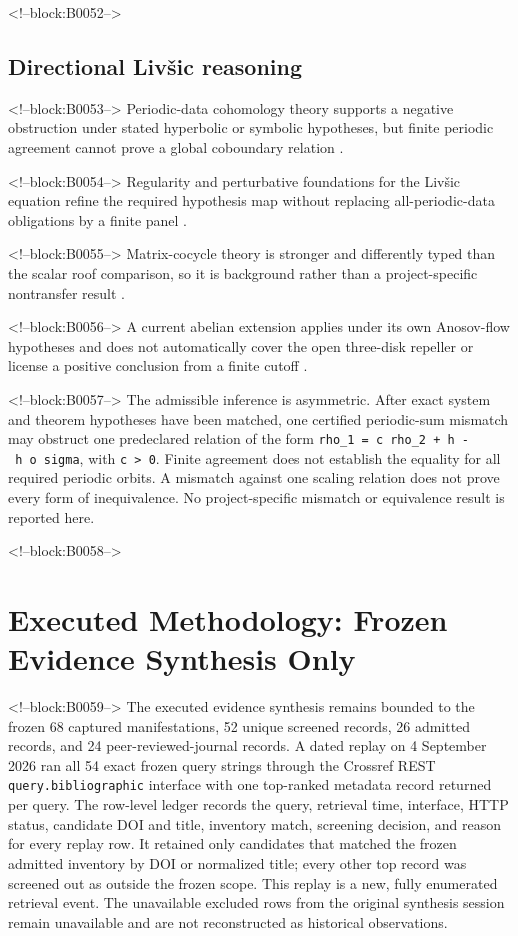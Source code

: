 \documentclass[11pt,a4paper]{article}
\begin{document}
<!--block:B0052-->
\subsection{Directional Livšic reasoning}

<!--block:B0053-->
Periodic-data cohomology theory supports a negative obstruction under stated hyperbolic or symbolic hypotheses, but finite periodic agreement cannot prove a global coboundary relation
\citep{P30-S23}.

<!--block:B0054-->
Regularity and perturbative foundations for the Livšic equation refine the required hypothesis map without replacing all-periodic-data obligations by a finite panel
\citep{P30-S24}.

<!--block:B0055-->
Matrix-cocycle theory is stronger and differently typed than the scalar roof comparison, so it is background rather than a project-specific nontransfer result
\citep{P30-S25}.

<!--block:B0056-->
A current abelian extension applies under its own Anosov-flow hypotheses and does not automatically cover the open three-disk repeller or license a positive conclusion from a finite cutoff
\citep{P30-S26}.

<!--block:B0057-->
The admissible inference is asymmetric. After exact system and theorem hypotheses have been matched, one certified periodic-sum mismatch may obstruct one predeclared relation of the form \texttt{rho\_1\ =\ c\ rho\_2\ +\ h\ -\ h\ o\ sigma}, with \texttt{c\ \textgreater{}\ 0}. Finite agreement does not establish the equality for all required periodic orbits. A mismatch against one scaling relation does not prove every form of inequivalence. No project-specific mismatch or equivalence result is reported here.

<!--block:B0058-->
\section{Executed Methodology: Frozen Evidence Synthesis Only}

<!--block:B0059-->
The executed evidence synthesis remains bounded to the frozen 68 captured
manifestations, 52 unique screened records, 26 admitted records, and 24
peer-reviewed-journal records.  A dated replay on 4 September 2026 ran all
54 exact frozen query strings through the Crossref REST
\texttt{query.bibliographic} interface with one top-ranked metadata record
returned per query.  The row-level ledger records the query, retrieval time,
interface, HTTP status, candidate DOI and title, inventory match, screening
decision, and reason for every replay row.  It retained only candidates that
matched the frozen admitted inventory by DOI or normalized title; every other
top record was screened out as outside the frozen scope.  This replay is a new,
fully enumerated retrieval event.  The unavailable excluded rows from the
original synthesis session remain unavailable and are not reconstructed as
historical observations.
\end{document}
